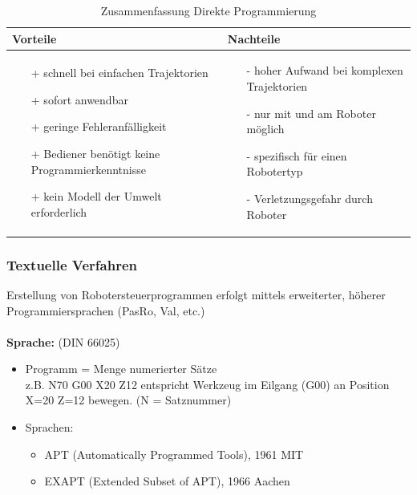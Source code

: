 \begin{table}[hbt]
\centering
\begin{tabular}{|p{7.5cm}|p{7.5cm}|}
\hline
Vorteile & Nachteile\\
\hline
\vspace{-5mm}
\begin{itemize}
\setlength\itemsep{0em}
\item[+] schnell bei einfachen Trajektorien
\item[+] sofort anwendbar
\item[+] geringe Fehleranfälligkeit
\item[+] Bediener benötigt keine Programmierkenntnisse
\item[+] kein Modell der Umwelt erforderlich
\end{itemize}
 &
 \vspace{-5mm}
\begin{itemize}
\setlength\itemsep{0em}
\item[-] hoher Aufwand bei komplexen Trajektorien
\item[-] nur mit und am Roboter möglich
\item[-] spezifisch für einen Robotertyp
\item[-] Verletzungsgefahr durch Roboter
\end{itemize}\\
\hline
\end{tabular}
\caption{Zusammenfassung Direkte Programmierung}
\label{tab:dirprog}
\end{table}
\subsubsection{Textuelle Verfahren}
Erstellung von Robotersteuerprogrammen erfolgt mittels erweiterter,
höherer Programmiersprachen (PasRo, Val, etc.)
\\ \\
\textbf{Sprache:} (DIN 66025)
\begin{itemize}
\item Programm = Menge numerierter Sätze\\
z.B. \glqq N70 G00 X20 Z12\grqq{} entspricht Werkzeug im Eilgang (G00) an Position X=20 Z=12 bewegen. (N = Satznummer)
\item Sprachen:
\begin{itemize}
\item APT (Automatically Programmed Tools), 1961 MIT
\item EXAPT (Extended Subset of APT), 1966 Aachen
\end{itemize}
\end{itemize}

